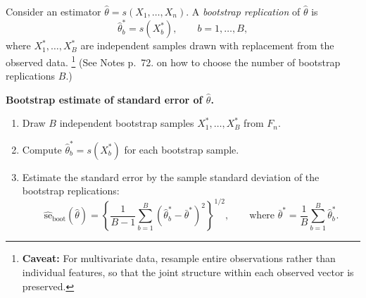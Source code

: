 Consider an estimator $\hat\theta=s(X_1,\ldots,X_n)$. A \emph{bootstrap replication} of $\hat\theta$ is
\[
    \hat\theta_b^*=s(X_b^*),
    \qquad b=1,\ldots,B,
\]
where $X_1^*,\ldots,X_B^*$ are independent samples drawn with replacement from the observed data.
\footnote{
    \textbf{Caveat:} For multivariate data, resample entire observations rather than individual features, so that the joint structure within each observed vector is preserved.
}
 (See Notes p.~72. on how to choose the number of bootstrap replications $B$.)

\begin{mybox}
\textbf{Bootstrap estimate of standard error of $\hat\theta$.}
\begin{enumerate}
    \item Draw $B$ independent bootstrap samples $X_1^*,\ldots,X_B^*$ from $F_n$.
    \item Compute $\hat\theta_b^*=s(X_b^*)$ for each bootstrap sample.
    \item Estimate the standard error by the sample standard deviation of the bootstrap replications:
    \[
        \widehat{\mathrm{se}}_{\mathrm{boot}}(\hat\theta)
        =
        \left\{
        \frac{1}{B-1}
        \sum_{b=1}^B
        (\hat\theta_b^*-\bar\theta^*)^2
        \right\}^{1/2},
        \qquad 
        \text{where } \bar\theta^*=\frac{1}{B}\sum_{b=1}^B \hat\theta_b^*.
    \]
\end{enumerate}
\end{mybox}

